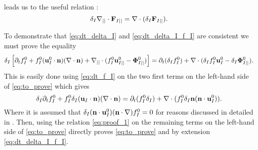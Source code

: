  leads us to the useful relation :
\begin{equation}
    \delta_I \mathbf{\nabla}_{||}\cdot \textbf{F}_{I||}
    = 
    \mathbf{\nabla}\cdot (\delta_I \textbf{F}_{I||}). 
    \label{eq:proof_1}
\end{equation}


To demonstrate that \ref{eq:dt_delta_I} and \ref{eq:dt_delta_I_f_I} are consistent we must prove the equality 
\begin{equation}
    \delta_I
    \left[ \partial_t f_I^0 
    + f_I^0 (\textbf{u}_{I}^0\cdot \textbf{n})  (\mathbf{\nabla}\cdot \textbf{n})
    +\mathbf{\nabla}_{||}\cdot
    (f_I^0 \textbf{u}_{I||}^0
    - \mathbf{\Phi}_{I||}^0 )
    \right]
    =
    \partial_t (\delta_If_I^0) 
    +\mathbf{\nabla}\cdot
    (\delta_If_I^0 \textbf{u}_I^0
        - \delta_I\mathbf{\Phi}_{I||}^0 ).
    \label{eq:to_prove}
\end{equation}
This is easily done  using \ref{eq:dt_f_I} on the two first terms on the left-hand side of \ref{eq:to_prove} which gives
\begin{equation*}
    \delta_I \partial_t f_I^0 
    + f_I^0 \delta_I (\textbf{u}_I\cdot\textbf{n})(\mathbf{\nabla}\cdot \textbf{n})
    = 
     \partial_t (f_I^0 \delta_I)
    + \mathbf{\nabla}\cdot(f_I^0  \delta_I \textbf{n}(\textbf{n}\cdot\textbf{u}_I^0)). 
\end{equation*}
Where it is assumed that $\delta_I (\textbf{n}\cdot\textbf{u}_I^0)(\textbf{n}\cdot\mathbf{\nabla}) f_I^0 = 0$ for reasons discussed in detailed in \citet{orlando2023evolution,estrada1985distributional}. 
Then, using the relation \ref{eq:proof_1} on the remaining terms on the left-hand side of \ref{eq:to_prove} directly proves \ref{eq:to_prove} and by extension \ref{eq:dt_delta_I_f_I}. 



